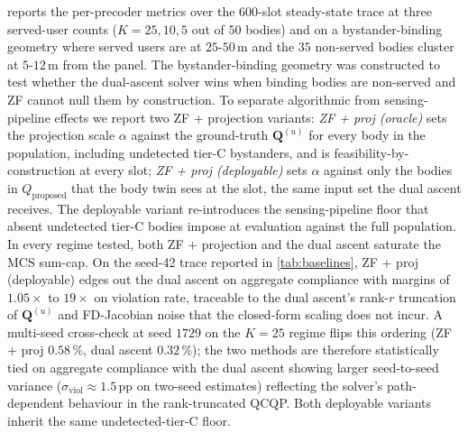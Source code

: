 \documentclass[journal,twocolumn,10pt]{IEEEtran}
\theoremstyle{plain}
\theoremstyle{remark}
\newcommand{\Qmat}{\mathbf{Q}}
\begin{document}
 reports the per-precoder metrics over the
$600$-slot steady-state trace at three served-user counts
($K = 25, 10, 5$ out of $50$ bodies) and on a bystander-binding
geometry where served users are at $25$-$50\,$m and the $35$
non-served bodies cluster at $5$-$12\,$m from the panel. The
bystander-binding geometry was constructed to test whether the
dual-ascent solver wins when binding bodies are non-served and ZF
cannot null them by construction. To separate algorithmic from
sensing-pipeline effects we report two ZF + projection variants:
\emph{ZF + proj (oracle)} sets the projection scale $\alpha$
against the ground-truth $\Qmat^{(u)}$ for every body in the
population, including undetected tier-C bystanders, and is
feasibility-by-construction at every slot; \emph{ZF + proj
(deployable)} sets $\alpha$ against only the bodies in
$Q_{\mathrm{proposed}}$ that the body twin sees at the slot, the
same input set the dual ascent receives. The deployable variant
re-introduces the sensing-pipeline floor that absent undetected
tier-C bodies impose at evaluation against the full population. In
every regime tested, both ZF + projection and the dual ascent
saturate the MCS sum-cap. On the seed-42 trace reported in
\cref{tab:baselines}, ZF + proj (deployable) edges out the dual
ascent on aggregate compliance with margins of $1.05\times$ to
$19\times$ on violation rate, traceable to the dual ascent's
rank-$r$ truncation of $\Qmat^{(u)}$ and FD-Jacobian noise that
the closed-form scaling does not incur. A multi-seed cross-check
at seed $1729$ on the $K = 25$ regime flips this ordering
(ZF + proj $0.58\,\%$, dual ascent $0.32\,\%$); the two methods
are therefore statistically tied on aggregate compliance with the
dual ascent showing larger seed-to-seed variance ($\sigma_{
\mathrm{viol}} \approx 1.5\,$pp on two-seed estimates) reflecting
the solver's path-dependent behaviour in the rank-truncated QCQP.
Both deployable variants inherit the same undetected-tier-C
floor.
\end{document}
